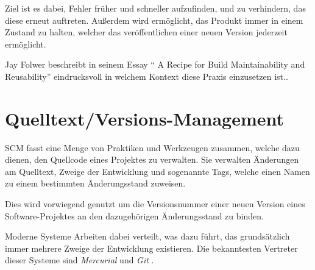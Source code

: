 Ziel ist es dabei, Fehler früher und schneller aufzufinden,
und zu verhindern, das diese erneut auftreten.
Außerdem wird ermöglicht, das Produkt immer in einem Zustand zu halten,
welcher das veröffentlichen einer neuen Version jederzeit ermöglicht.

Jay Folwer beschreibt in seinem Essay ``
A Recipe for Build Maintainability and Reusability'' \cite{folwer:receipe} eindrucksvoll in welchem Kontext diese Praxis einzusetzen ist..


\section{Quelltext/Versions-Management}
\label{sec:base:scm}


\ac{SCM} fasst eine Menge
von Praktiken und Werkzeugen zusammen,
welche dazu dienen, den Quellcode eines Projektes zu verwalten.
Sie verwalten Änderungen am Quelltext, Zweige der Entwicklung und sogenannte Tags,
welche einen Namen zu einem bestimmten Änderungsstand zuweisen.

Dies wird vorwiegend genutzt um die Versionsnummer einer neuen Version eines Software-Projektes an den dazugehörigen Änderungsstand zu binden.

Moderne Systeme Arbeiten dabei verteilt,
was dazu führt, das grundsätzlich immer mehrere Zweige der Entwicklung existieren.
Die bekanntesten Vertreter dieser Systeme sind \emph{Mercurial} \cite{mercurial:website}
und \emph{Git} \cite{git:website}.

